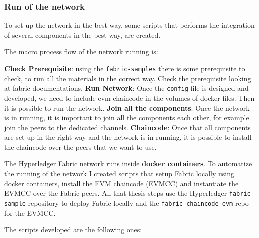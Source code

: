 \subsubsection{Run of the network}

To set up the network in the best way, some scripts that performs the integration of several components 
in the best way, are created.

The macro process flow of the network running is:
\begin{outline}[enumerate]
    \1 \textbf{Check Prerequisite}: using the \texttt{fabric-samples}\cite{fabric-sample} there is
    some prerequisite to check, to run all the materials in the correct way. Check the prerequisite looking at fabric 
    documentations\cite{fabric-doc}.
    \1 \textbf{Run Network}: Once the \texttt{config} file is designed and developed, we need to include evm chaincode 
    in the volumes of docker files. Then it is possible to run the network.
    \1 \textbf{Join all the components}: Once the network is in running, it is important to join all the components each 
    other, for example join the peers to the dedicated channels.
    \1 \textbf{Chaincode}: Once that all components are set up in the right way and the network is in running, it is 
    possible to install the chaincode over the peers that we want to use. 
\end{outline}

The Hyperledger Fabric network runs inside \textbf{docker containers}. To automatize the running 
of the network I created scripts that setup Fabric locally using docker containers, install the EVM chaincode (EVMCC) 
and instantiate the EVMCC over the Fabric peers. All that thesis steps use the Hyperledger \texttt{fabric-sample} 
repository to deploy Fabric locally and the \texttt{fabric-chaincode-evm} repo for the EVMCC.

The scripts developed are the following ones:

